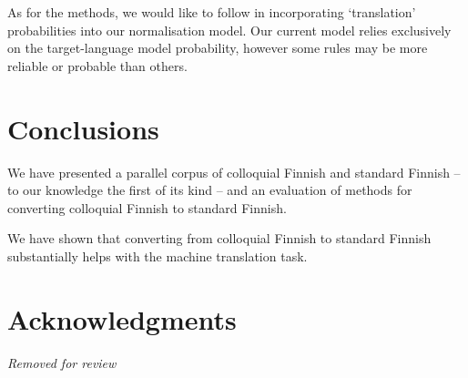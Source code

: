\documentclass[11pt]{article}
\begin{document}
As for the methods, we would like to follow  in incorporating
`translation' probabilities into our normalisation model. Our current model relies 
exclusively on the target-language model probability, however some rules may be more
reliable or probable than others.

\section{Conclusions}

We have presented a parallel corpus of colloquial Finnish and standard Finnish --
to our knowledge the first of its kind -- and an evaluation of methods for 
converting colloquial Finnish to standard Finnish. 

We have shown that converting from colloquial Finnish to standard Finnish substantially
helps with the machine translation task.


\section*{Acknowledgments}

\textit{Removed for review}



\end{document}
